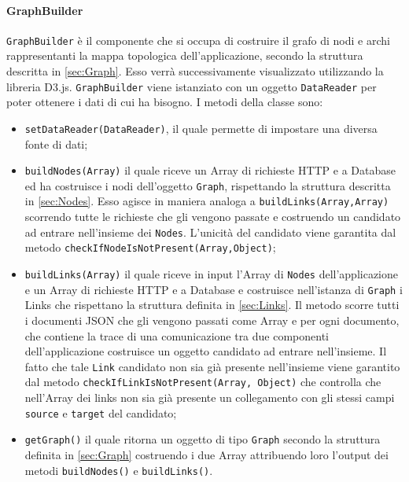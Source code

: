 \paragraph{GraphBuilder}
\label{sec:GraphBuilder}
	\texttt{GraphBuilder} è il componente che si occupa di costruire il grafo di nodi e archi rappresentanti la mappa topologica dell'applicazione, secondo la struttura descritta in \ref{sec:Graph}. Esso verrà successivamente visualizzato utilizzando la libreria D3.js. \texttt{GraphBuilder} viene istanziato con un oggetto \texttt{DataReader} per poter ottenere i dati di cui ha bisogno.
	I metodi della classe sono:
	\begin{itemize}
		\item{\texttt{setDataReader(DataReader)}, il quale permette di impostare una diversa fonte di dati; }
		
		\item{\texttt{buildNodes(Array)} il quale riceve un Array di richieste HTTP e a Database ed ha costruisce i nodi dell'oggetto \texttt{Graph}, rispettando la struttura descritta in \ref{sec:Nodes}. Esso agisce in maniera analoga a \texttt{buildLinks(Array,Array)} scorrendo tutte le richieste che gli vengono passate e costruendo un candidato ad entrare nell'insieme dei \texttt{Nodes}. L'unicità del candidato viene garantita dal metodo \texttt{checkIfNodeIsNotPresent(Array,Object)};}
				
		\item{\texttt{buildLinks(Array)} il quale riceve in input l'Array di \texttt{Nodes} dell'applicazione e un Array di richieste HTTP e a Database e costruisce nell'istanza di \texttt{Graph} i Links che rispettano la struttura definita in \ref{sec:Links}. Il metodo scorre tutti i documenti JSON che gli vengono passati come Array e per ogni documento, che contiene la trace di una comunicazione tra due componenti dell'applicazione costruisce un oggetto candidato ad entrare nell'insieme. Il fatto che tale \texttt{Link} candidato non sia già presente nell'insieme viene garantito dal metodo \texttt{checkIfLinkIsNotPresent(Array, Object)} che controlla che nell'Array dei links non sia già presente un collegamento con gli stessi campi \texttt{source} e \texttt{target} del candidato; }

		\item{\texttt{getGraph()} il quale ritorna un oggetto di tipo \texttt{Graph} secondo la struttura definita in \ref{sec:Graph} costruendo i due Array attribuendo loro l'output dei metodi \texttt{buildNodes()} e \texttt{buildLinks()}.  }
	\end{itemize}




















